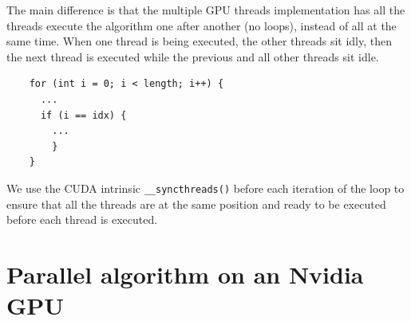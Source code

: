 \documentclass{article}
\begin{document}
\smallbreak
\noindent The main difference is that the multiple GPU threads implementation has all the threads execute the algorithm one after another (no loops), instead of all at the same time. When one thread is being executed, the other threads sit idly, then the next thread is executed while the previous and all other threads sit idle.
\begin{mdframed}[backgroundcolor=light-gray, roundcorner=10pt,leftmargin=0.5, rightmargin=0.5, innertopmargin=5,innerbottommargin=5, outerlinewidth=1, linecolor=light-gray]
\begin{verbatim}
    for (int i = 0; i < length; i++) {
      ...
      if (i == idx) {
        ... 
        }
    }
\end{verbatim}
\end{mdframed}
We use the CUDA intrinsic \texttt{__syncthreads()} before each iteration of the loop to ensure that all the threads are at the same position and ready to be executed before each thread is executed.

\section{Parallel algorithm on an Nvidia GPU}
\end{document}
